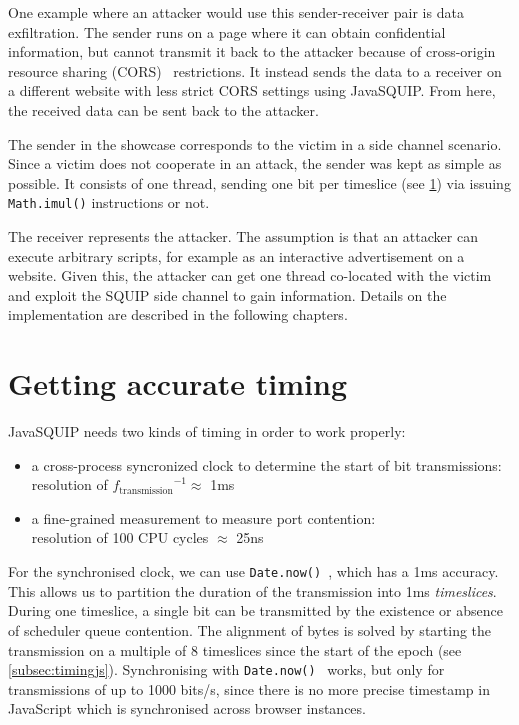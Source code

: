 \documentclass[11pt,
  titlepage=false,
  parskip=half,      %
]{scrreprt}
\begin{document}
One example where an attacker would use this sender-receiver pair is data exfiltration.
The sender runs on a page where it can obtain confidential information,
but cannot transmit it back to the attacker because of cross-origin resource sharing (CORS)~\cite{cors} restrictions.
It instead sends the data to a receiver on a different website with less strict CORS settings using JavaSQUIP.
From here, the received data can be sent back to the attacker.

The sender in the showcase corresponds to the victim in a side channel scenario.
Since a victim does not cooperate in an attack, the sender was kept as simple as possible.
It consists of one thread, sending one bit per timeslice (see \ref{sec:accurate-timing}) via issuing \texttt{Math.imul()} instructions or not.

The receiver represents the attacker.
The assumption is that an attacker can execute arbitrary scripts, for example as an interactive advertisement on a website.
Given this, the attacker can get one thread co-located with the victim and exploit the SQUIP side channel to gain information.
Details on the implementation are described in the following chapters.

\section{Getting accurate timing}
\label{sec:accurate-timing}
JavaSQUIP needs two kinds of timing in order to work properly:
\begin{itemize}
    \item a cross-process syncronized clock to determine the start of bit transmissions:\\
    resolution of ${f_{\text{transmission}}}^{-1} \approx$ 1ms
    \item a fine-grained measurement to measure port contention:\\
    resolution of 100 CPU cycles $\approx$ 25ns
\end{itemize}

For the synchronised clock, we can use \texttt{Date.now()}~\cite{datenow}, which has a 1ms accuracy.
This allows us to partition the duration of the transmission into 1ms \textit{timeslices}.
During one timeslice, a single bit can be transmitted by the existence or absence of scheduler queue contention.
The alignment of bytes is solved by starting the transmission on a multiple of 8 timeslices since the start of the epoch (see \ref{subsec:timingjs}).
Synchronising with \texttt{Date.now()}~\cite{datenow} works, but only for transmissions of up to 1000 bits/s,
since there is no more precise timestamp in JavaScript which is synchronised across browser instances.
\end{document}

